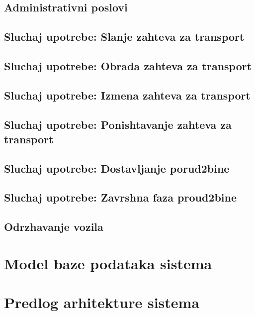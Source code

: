 \documentclass{article}
\begin{document}
\subsection{Administrativni poslovi}



\subsection{Sluchaj upotrebe: Slanje zahteva za transport}


\subsection{Sluchaj upotrebe: Obrada zahteva za transport}


\subsection{Sluchaj upotrebe: Izmena zahteva za transport}


\subsection{Sluchaj upotrebe: Ponishtavanje zahteva za transport}


\subsection{Sluchaj upotrebe: Dostavljanje porud2bine}

\subsection{Sluchaj upotrebe: Zavrshna faza proud2bine}


\subsection{Odrzhavanje vozila}



\section{Model baze podataka sistema}


\section{Predlog arhitekture sistema}


\newpage

\nocite{*}
\selectfont



\end{document}
